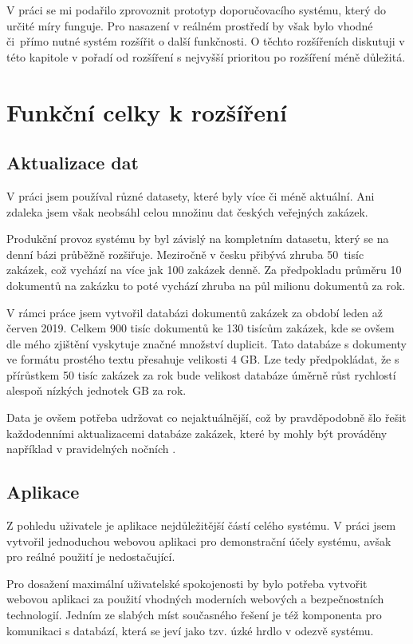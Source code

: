 \documentclass[thesis=M,czech]{FITthesis}[2019/12/23]
\begin{document}
V práci se mi podařilo zprovoznit prototyp doporučovacího systému, který do určité míry funguje. Pro nasazení v reálném prostředí by však bylo vhodné či~přímo nutné systém rozšířit o další funkčnosti. O těchto rozšířeních diskutuji v této kapitole v pořadí od rozšíření s nejvyšší prioritou po rozšíření méně důležitá.

\newpage
\section{Funkční celky k rozšíření}
\subsection{Aktualizace dat}

V práci jsem používal různé datasety, které byly více či méně aktuální. Ani zdaleka jsem však neobsáhl celou množinu dat českých veřejných zakázek. 

Produkční provoz systému by byl závislý na kompletním datasetu, který se na denní bázi průběžně rozšiřuje. Meziročně v česku přibývá zhruba 50~tisíc zakázek, což vychází na více jak 100 zakázek denně. Za předpokladu průměru 10 dokumentů na zakázku to poté vychází zhruba na půl milionu dokumentů za rok.

V rámci práce jsem vytvořil databázi dokumentů zakázek za období leden až červen 2019. Celkem 900 tisíc dokumentů ke 130 tisícům zakázek, kde se ovšem dle mého zjištění vyskytuje značné množství duplicit. Tato databáze s dokumenty ve formátu prostého textu přesahuje velikosti 4 GB. Lze tedy předpokládat, že s přírůstkem 50 tisíc zakázek za rok bude velikost databáze úměrně růst rychlostí alespoň nízkých jednotek GB za rok.

Data je ovšem potřeba udržovat co nejaktuálnější, což by pravděpodobně šlo řešit každodenními aktualizacemi databáze zakázek, které by mohly být prováděny například v pravidelných nočních .

\subsection{Aplikace}

Z pohledu uživatele je aplikace nejdůležitější částí celého systému. V práci jsem vytvořil jednoduchou webovou aplikaci pro demonstrační účely systému, avšak pro reálné použití je nedostačující.

Pro dosažení maximální uživatelské spokojenosti by bylo potřeba vytvořit webovou aplikaci za použití vhodných moderních webových a bezpečnostních technologií. Jedním ze slabých míst současného řešení je též komponenta pro komunikaci s databází, která se jeví jako tzv. úzké hrdlo v odezvě systému.
\end{document}
